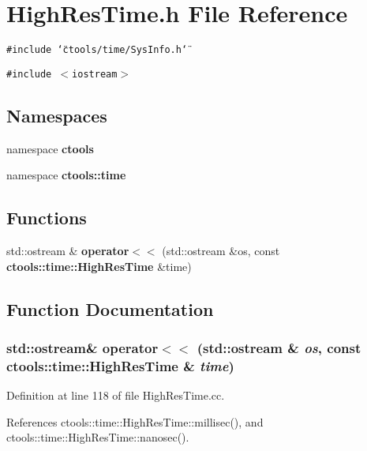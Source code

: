 \section{High\-Res\-Time.h File Reference}
\label{HighResTime_8h}
{\tt \#include \char`\"{}ctools/time/Sys\-Info.h\char`\"{}}\par
{\tt \#include $<$iostream$>$}\par
\subsection*{Namespaces}
\begin{CompactItemize}
\item 
namespace {\bf ctools}
\item 
namespace {\bf ctools::time}
\end{CompactItemize}
\subsection*{Functions}
\begin{CompactItemize}
\item 
std::ostream \& {\bf operator$<$$<$} (std::ostream \&os, const {\bf ctools::time::High\-Res\-Time} \&time)
\end{CompactItemize}


\subsection{Function Documentation}
\subsubsection{\setlength{\rightskip}{0pt plus 5cm}std::ostream\& operator$<$$<$ (std::ostream \& {\em os}, const {\bf ctools::time::High\-Res\-Time} \& {\em time})}\label{HighResTime_8h_a0}




Definition at line 118 of file High\-Res\-Time.cc.

References ctools::time::High\-Res\-Time::millisec(), and ctools::time::High\-Res\-Time::nanosec().